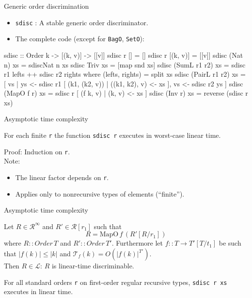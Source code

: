 \documentclass{beamer}
\begin{document}
\begin{frame}[fragile]{Generic order discrimination}
  \begin{itemize}
  \item \lstinline|sdisc| : A stable generic order discriminator.
  \item The complete code (except for \lstinline|BagO|, \lstinline|SetO|):
  \end{itemize}
\begin{haskell}[style=long]
sdisc :: Order k -> [(k, v)] -> [[v]]
sdisc r []               = []
sdisc r [(k, v)]         = [[v]]
sdisc (Nat n) xs         = sdiscNat n xs
sdisc Triv xs            = [map snd xs]
sdisc (SumL r1 r2) xs    = sdisc r1 lefts ++ sdisc r2 rights
   where (lefts, rights) = split xs
sdisc (PairL r1 r2) xs   =
  [ vs | ys <- sdisc r1 [ (k1, (k2, v)) | ((k1, k2), v) <- xs ],
         vs <- sdisc r2 ys ]
sdisc (MapO f r) xs      = sdisc r [ (f k, v) | (k, v) <- xs ]
sdisc (Inv r) xs         = reverse (sdisc r xs)
\end{haskell}
\end{frame}

\begin{frame}[fragile]{Asymptotic time complexity}
  \begin{theorem}
    For each finite \lstinline|r| the function \lstinline|sdisc r| executes in
    worst-case linear time.
  \end{theorem}
  Proof: Induction on \lstinline|r|.\\
  Note:
  \begin{itemize}
  \item The linear factor depends on \lstinline|r|.
  \item Applies only to nonrecursive types of elements (``finite'').
  \end{itemize}
\end{frame}

\begin{frame}[fragile]{Asymptotic time complexity}
  \begin{theorem}
    Let $R \in \mathcal{R}^\infty$ and $R' \in \mathcal{R}[r_1]$ such that
    \[ R = \mathrm{MapO}\,f\,(R'[R/r_1]) \]
    where $R :: Order\,T$ and $R' :: Order\,T'$. Furthermore let
    $f :: T \rightarrow T'[T/t_1]$ be such that $|f(k)| \leq |k|$ and
    $\mathcal{T}_f(k) = O(|f(k)|^{T'})$.\\
    Then $R \in \mathcal{L}$: $R$ is linear-time discriminable.
  \end{theorem}
  \begin{corollary}
    For all standard orders \lstinline|r| on first-order regular recursive types,
    \lstinline|sdisc r xs| executes in linear time.
  \end{corollary}
\end{frame}
\end{document}
